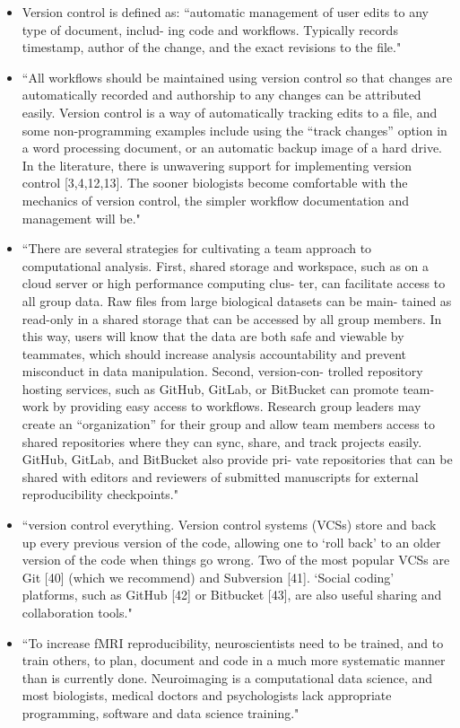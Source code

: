 \documentclass[pdftex,english,11pt,parskip=half]{scrartcl}
\begin{document}
\begin{itemize}
\item Version control is defined as: ``automatic management of user edits to any type of document, includ- ing code and workflows. Typically records timestamp, author of the change, and the exact revisions to the file." \cite{shade2015computing}
\item ``All workflows should be maintained using version control so that changes are automatically recorded and authorship to any changes can be attributed easily. Version control is a way of automatically tracking edits to a file, and some non-programming examples include using the “track changes” option in a word processing document, or an automatic backup image of a hard drive. In the literature, there is unwavering support for implementing version control [3,4,12,13]. The sooner biologists become comfortable with the mechanics of version control, the simpler workflow documentation and management will be." \cite{shade2015computing}
\item ``There are several strategies for cultivating a team approach to computational analysis. First, shared storage and workspace, such as on a cloud server or high performance computing clus- ter, can facilitate access to all group data. Raw files from large biological datasets can be main- tained as read-only in a shared storage that can be accessed by all group members. In this way, users will know that the data are both safe and viewable by teammates, which should increase analysis accountability and prevent misconduct in data manipulation. Second, version-con- trolled repository hosting services, such as GitHub, GitLab, or BitBucket can promote team- work by providing easy access to workflows. Research group leaders may create an “organization” for their group and allow team members access to shared repositories where they can sync, share, and track projects easily. GitHub, GitLab, and BitBucket also provide pri- vate repositories that can be shared with editors and reviewers of submitted manuscripts for external reproducibility checkpoints." \cite{shade2015computing}
\item ``version control everything. Version control systems (VCSs) store and back up every previous version of the code, allowing one to ‘roll back’ to an older version of the code when things go wrong. Two of the most popular VCSs are Git [40] (which we recommend) and Subversion [41]. ‘Social coding’ platforms, such as GitHub [42] or Bitbucket [43], are also useful sharing and collaboration tools." \cite{pernet2015improving}
\item ``To increase fMRI reproducibility, neuroscientists need to be trained, and to train others, to plan, document and code in a much more systematic manner than is currently done. Neuroimaging is a computational data science, and most biologists, medical doctors and psychologists lack appropriate programming, software and data science training." \cite{pernet2015improving}
\end{itemize}
\end{document}
